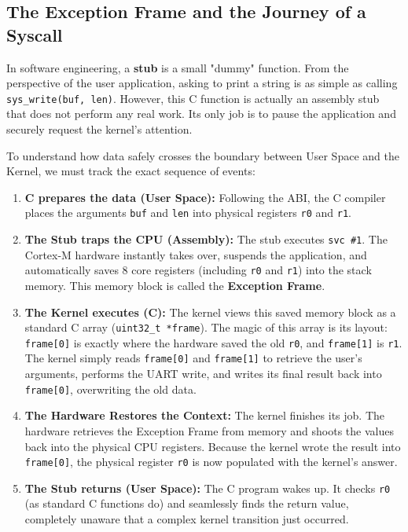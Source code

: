 \subsection{The Exception Frame and the Journey of a Syscall}
In software engineering, a \textbf{stub} is a small "dummy" function. From the perspective of the user application, asking to print a string is as simple as calling \texttt{sys\_write(buf, len)}. However, this C function is actually an assembly stub that does not perform any real work. Its only job is to pause the application and securely request the kernel's attention.

To understand how data safely crosses the boundary between User Space and the Kernel, we must track the exact sequence of events:

\begin{enumerate}
    \item \textbf{C prepares the data (User Space):} Following the ABI, the C compiler places the arguments \texttt{buf} and \texttt{len} into physical registers \texttt{r0} and \texttt{r1}.
    \item \textbf{The Stub traps the CPU (Assembly):} The stub executes \texttt{svc \#1}. The Cortex-M hardware instantly takes over, suspends the application, and automatically saves 8 core registers (including \texttt{r0} and \texttt{r1}) into the stack memory. This memory block is called the \textbf{Exception Frame}.
    \item \textbf{The Kernel executes (C):} The kernel views this saved memory block as a standard C array (\texttt{uint32\_t *frame}). The magic of this array is its layout: \texttt{frame[0]} is exactly where the hardware saved the old \texttt{r0}, and \texttt{frame[1]} is \texttt{r1}. The kernel simply reads \texttt{frame[0]} and \texttt{frame[1]} to retrieve the user's arguments, performs the UART write, and writes its final result back into \texttt{frame[0]}, overwriting the old data.
    \item \textbf{The Hardware Restores the Context:} The kernel finishes its job. The hardware retrieves the Exception Frame from memory and shoots the values back into the physical CPU registers. Because the kernel wrote the result into \texttt{frame[0]}, the physical register \texttt{r0} is now populated with the kernel's answer.
    \item \textbf{The Stub returns (User Space):} The C program wakes up. It checks \texttt{r0} (as standard C functions do) and seamlessly finds the return value, completely unaware that a complex kernel transition just occurred.
\end{enumerate}

